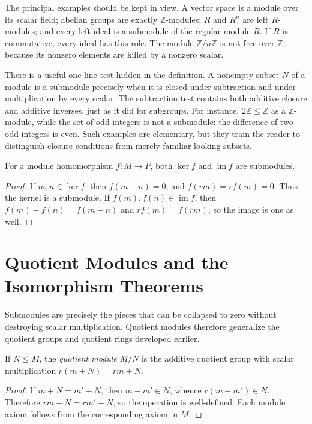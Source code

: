 The principal examples should be kept in view. A vector space is a module
over its scalar field; abelian groups are exactly \(\mathbb Z\)-modules;
\(R\) and \(R^n\) are left \(R\)-modules; and every left ideal is a
submodule of the regular module \(R\). If \(R\) is commutative, every ideal
has this role. The module \(\mathbb Z/n\mathbb Z\) is not free over
\(\mathbb Z\), because its nonzero elements are killed by a nonzero scalar.

There is a useful one-line test hidden in the definition. A nonempty subset
\(N\) of a module is a submodule precisely when it is closed under
subtraction and under multiplication by every scalar. The subtraction test
contains both additive closure and additive inverses, just as it did for
subgroups. For instance, \(2\mathbb Z\leq\mathbb Z\) as a
\(\mathbb Z\)-module, while the set of odd integers is not a submodule:
the difference of two odd integers is even. Such examples are elementary,
but they train the reader to distinguish closure conditions from merely
familiar-looking subsets.

\begin{proposition}\label{prop:module-kernel-image}
For a module homomorphism \(f:M\to P\), both \(\ker f\) and
\(\operatorname{im}f\) are submodules.
\end{proposition}
\begin{proof}
If \(m,n\in\ker f\), then \(f(m-n)=0\), and \(f(rm)=rf(m)=0\). Thus the
kernel is a submodule. If \(f(m),f(n)\in\operatorname{im}f\), then
\(f(m)-f(n)=f(m-n)\) and \(rf(m)=f(rm)\), so the image is one as well.
\end{proof}

\section{Quotient Modules and the Isomorphism Theorems}
Submodules are precisely the pieces that can be collapsed to zero without
destroying scalar multiplication. Quotient modules therefore generalize the
quotient groups and quotient rings developed earlier.

\begin{definition}
If \(N\leq M\), the \emph{quotient module} \(M/N\) is the additive quotient
group with scalar multiplication \(r(m+N)=rm+N\).
\end{definition}
\begin{proof}
If \(m+N=m'+N\), then \(m-m'\in N\), whence \(r(m-m')\in N\). Therefore
\(rm+N=rm'+N\), so the operation is well-defined. Each module axiom follows
from the corresponding axiom in \(M\).
\end{proof}

